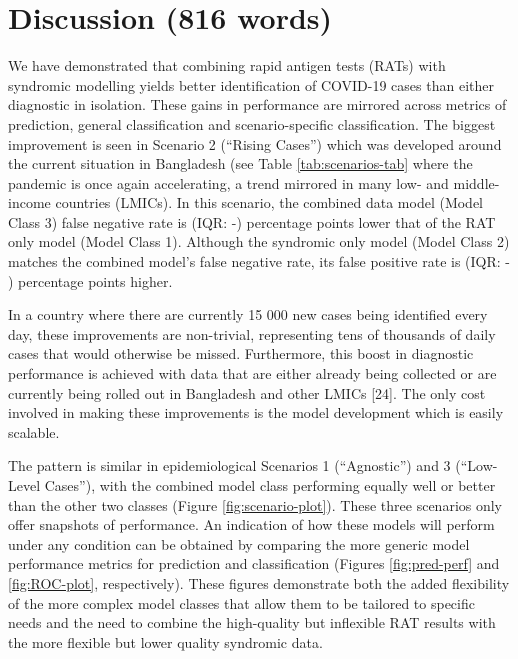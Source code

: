 \documentclass[]{elsarticle} %
\begin{document}
\hypertarget{discussion-816-words}{%
\section{Discussion (816 words)}\label{discussion-816-words}}

We have demonstrated that combining rapid antigen tests (RATs) with syndromic modelling yields better identification of COVID-19 cases than either diagnostic in isolation.
These gains in performance are mirrored across metrics of prediction, general classification and scenario-specific classification.
The biggest improvement is seen in Scenario 2 (``Rising Cases'') which was developed around the current situation in Bangladesh (see Table \ref{tab:scenarios-tab} where the pandemic is once again accelerating, a trend mirrored in many low- and middle- income countries (LMICs).
In this scenario, the combined data model (Model Class 3) false negative rate is  (IQR: -) percentage points lower that of the RAT only model (Model Class 1).
Although the syndromic only model (Model Class 2) matches the combined model's false negative rate, its false positive rate is  (IQR: - ) percentage points higher.

In a country where there are currently 15 000 new cases being identified every day, these improvements are non-trivial, representing tens of thousands of daily cases that would otherwise be missed.
Furthermore, this boost in diagnostic performance is achieved with data that are either already being collected or are currently being rolled out in Bangladesh and other LMICs {[}24{]}.
The only cost involved in making these improvements is the model development which is easily scalable.

The pattern is similar in epidemiological Scenarios 1 (``Agnostic'') and 3 (``Low-Level Cases''), with the combined model class performing equally well or better than the other two classes (Figure \ref{fig:scenario-plot}).
These three scenarios only offer snapshots of performance.
An indication of how these models will perform under any condition can be obtained by comparing the more generic model performance metrics for prediction and classification (Figures \ref{fig:pred-perf} and \ref{fig:ROC-plot}, respectively).
These figures demonstrate both the added flexibility of the more complex model classes that allow them to be tailored to specific needs and the need to combine the high-quality but inflexible RAT results with the more flexible but lower quality syndromic data.
\end{document}
